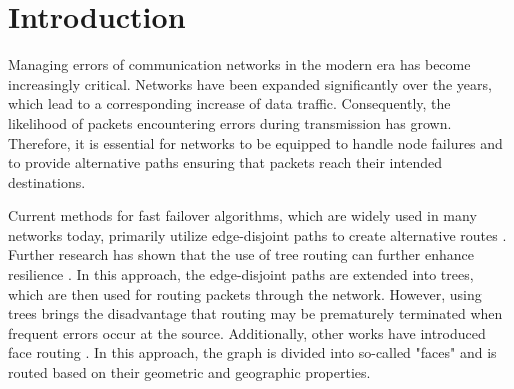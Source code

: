 \documentclass[a4paper,UKenglish,cleveref, autoref, thm-restate,dvipsnames]{lipics-v2021}
\begin{document}
\section{Introduction}

\label{sec:introduction}






Managing errors of communication networks in the modern era has become increasingly critical. 
Networks have been expanded significantly over the years, which lead to a corresponding increase of data traffic.
Consequently, the likelihood of packets encountering errors during transmission has grown. 
Therefore, it is essential for networks to be equipped to handle node failures and to provide alternative paths ensuring that packets reach their intended destinations.

Current methods for fast failover algorithms, which are widely used in many networks today, primarily utilize edge-disjoint paths to create alternative routes \cite{only-edp1,only-edp2}.
Further research has shown that the use of tree routing can further enhance resilience \cite{tree}.
In this approach, the edge-disjoint paths are extended into trees, which are then used for routing packets through the network.
However, using trees brings the disadvantage that routing may be prematurely terminated when frequent errors occur at the source. Additionally, other works have introduced face routing \cite{facerouting2, facerouting}. In this approach, the graph is divided into so-called "faces" and is routed based on their geometric and geographic properties.
\end{document}
